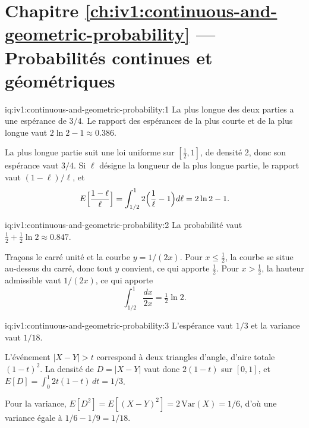 \section*{Chapitre \ref{ch:iv1:continuous-and-geometric-probability} --- Probabilités continues et géométriques}

\begin{solution}{iq:iv1:continuous-and-geometric-probability:1}
La plus longue des deux parties a une espérance de $3/4$. Le rapport des espérances de la plus courte et de la plus longue vaut $2\ln 2 - 1 \approx 0.386$.

La plus longue partie suit une loi uniforme sur $[\tfrac12, 1]$, de densité 2, donc son espérance vaut $3/4$. Si $\ell$ désigne la longueur de la plus longue partie, le rapport vaut $(1 - \ell)/\ell$, et
\[
E\Bigl[\frac{1 - \ell}{\ell}\Bigr] = \int_{1/2}^{1} 2\Bigl(\frac1\ell - 1\Bigr) d\ell = 2\ln 2 - 1.
\]
\end{solution}

\begin{solution}{iq:iv1:continuous-and-geometric-probability:2}
La probabilité vaut $\tfrac12 + \tfrac12 \ln 2 \approx 0.847$.

Traçons le carré unité et la courbe $y = 1/(2x)$. Pour $x \le \tfrac12$, la courbe se situe au-dessus du carré, donc tout $y$ convient, ce qui apporte $\tfrac12$. Pour $x > \tfrac12$, la hauteur admissible vaut $1/(2x)$, ce qui apporte
\[
\int_{1/2}^{1} \frac{dx}{2x} = \tfrac12 \ln 2.
\]
\end{solution}

\begin{solution}{iq:iv1:continuous-and-geometric-probability:3}
L'espérance vaut $1/3$ et la variance vaut $1/18$.

L'événement $|X - Y| > t$ correspond à deux triangles d'angle, d'aire totale $(1 - t)^2$. La densité de $D = |X - Y|$ vaut donc $2(1 - t)$ sur $[0, 1]$, et $E[D] = \int_0^1 2t(1 - t)\,dt = 1/3$.

Pour la variance, $E[D^2] = E[(X - Y)^2] = 2\,\mathrm{Var}(X) = 1/6$, d'où une variance égale à $1/6 - 1/9 = 1/18$.

\end{solution}

